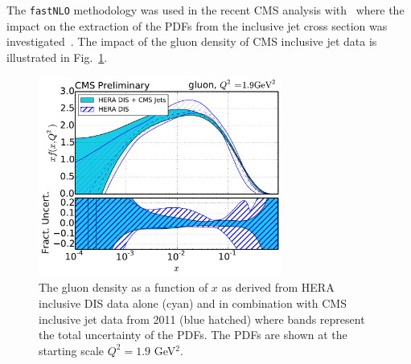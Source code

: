 \begin{description}
\begin{itemize}
The \texttt{fastNLO} methodology was used in the recent CMS analysis with \fitter\ where the impact
on the extraction of the PDFs from the inclusive jet cross section was investigated~\cite{cms:jets}. 
The impact of the gluon density of CMS inclusive jet data is illustrated in Fig.~\ref{fig:cmsjet}.
\begin{figure}[!ht]
   \centering
   \includegraphics[width=8cm]{CMSjets.pdf}
   \caption{The gluon density as a function of $x$ as derived from HERA inclusive DIS data 
            alone (cyan) and in combination with CMS inclusive jet data from 2011 (blue hatched)
            where bands represent the total uncertainty of the PDFs. 
            The PDFs are shown at the starting scale $Q^2= 1.9$ GeV$^2$.}
 \label{fig:cmsjet}
\end{figure}


\end{itemize}

\end{description}

